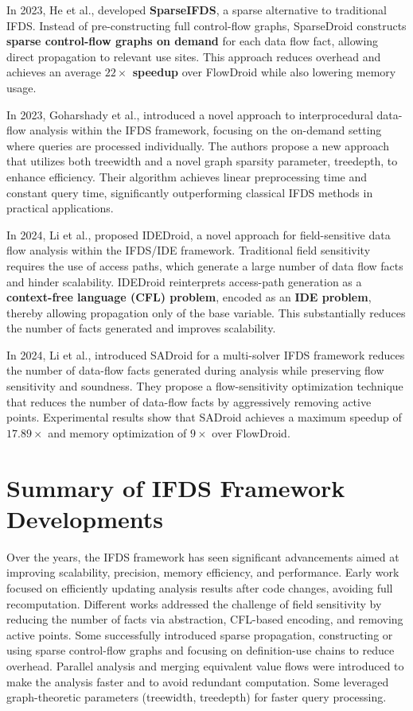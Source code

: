 In 2023, He et al., developed \textbf{SparseIFDS}, a sparse alternative to traditional IFDS. Instead of pre-constructing full control-flow graphs, SparseDroid constructs \textbf{sparse control-flow graphs on demand} for each data flow fact, allowing direct propagation to relevant use sites. This approach reduces overhead and achieves an average \textbf{$22\times$ speedup} over FlowDroid while also lowering memory usage.

In 2023, Goharshady et al., introduced a novel approach to interprocedural data-flow analysis within the IFDS framework, focusing on the on-demand setting where queries are processed individually. The authors propose a new approach that utilizes both treewidth and a novel graph sparsity parameter, treedepth, to enhance efficiency. Their algorithm achieves linear preprocessing time and constant query time, significantly outperforming classical IFDS methods in practical applications.

In 2024, Li et al., proposed IDEDroid,  a novel approach for field-sensitive data flow analysis within the IFDS/IDE framework. Traditional field sensitivity requires the use of access paths, which generate a large number of data flow facts and hinder scalability. IDEDroid reinterprets access-path generation as a \textbf{context-free language (CFL) problem}, encoded as an \textbf{IDE problem}, thereby allowing propagation only of the base variable. This substantially reduces the number of facts generated and improves scalability.

In 2024, Li et al., introduced SADroid for a multi-solver IFDS framework reduces the number of data-flow facts generated during analysis while preserving flow sensitivity and soundness. They propose a flow-sensitivity optimization technique that reduces the number of data-flow facts by aggressively removing active points. Experimental results show that SADroid achieves a maximum speedup of $17.89\times$ and memory optimization of $9\times$ over FlowDroid.

\section*{Summary of IFDS Framework Developments}

Over the years, the IFDS framework has seen significant advancements aimed at improving scalability, precision, memory efficiency, and performance.
Early work focused on efficiently updating analysis results after code changes, avoiding full recomputation.
Different works addressed the challenge of field sensitivity by reducing the number of facts via abstraction, CFL-based encoding, and removing active points.
Some successfully introduced sparse propagation, constructing or using sparse control-flow graphs and focusing on definition-use chains to reduce overhead.
Parallel analysis and merging equivalent value flows were introduced to make the analysis faster and to avoid redundant computation.
Some leveraged graph-theoretic parameters (treewidth, treedepth) for faster query processing.

